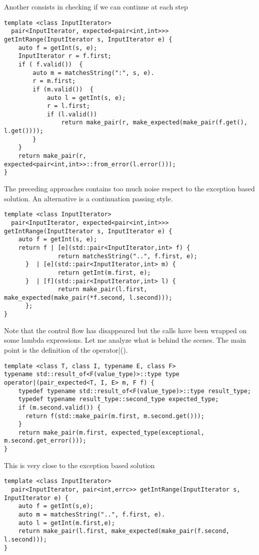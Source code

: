\documentclass[a4paper,10pt]{article}
\begin{document}
Another consists in checking if we can continue at each step

\begin{lstlisting}
template <class InputIterator>
  pair<InputIterator, expected<pair<int,int>>> getIntRange(InputIterator s, InputIterator e) {
    auto f = getInt(s, e);
    InputIterator r = f.first;
    if ( f.valid())  {
        auto m = matchesString(":", s, e).
        r = m.first;
        if (m.valid())  {
            auto l = getInt(s, e);
            r = l.first;
            if (l.valid())  
                return make_pair(r, make_expected(make_pair(f.get(), l.get())));
        }
    }        
    return make_pair(r, expected<pair<int,int>>::from_error(l.error()));
}
\end{lstlisting}

The preceding approaches contains too much noise respect to the exception based solution. An alternative is a continuation passing style. 

\begin{lstlisting}
template <class InputIterator>
  pair<InputIterator, expected<pair<int,int>>> getIntRange(InputIterator s, InputIterator e) {
    auto f = getInt(s, e);
    return f | [e](std::pair<InputIterator,int> f) {
    	       return matchesString("..", f.first, e); 
	  }  | [e](std::pair<InputIterator,int> m) {
               return getInt(m.first, e); 
	  }  | [f](std::pair<InputIterator,int> l) {
               return make_pair(l.first, make_expected(make_pair(*f.second, l.second))); 
	  };
}
\end{lstlisting}

Note that the control flow has disappeared but the calls have been wrapped on some lambda expressions. Let me analyze what is behind the scenes. The main point is the definition of the operator|(). 

\begin{lstlisting}
template <class T, class I, typename E, class F>
typename std::result_of<F(value_type)>::type type
operator|(pair_expected<T, I, E> m, F f) {
    typedef typename std::result_of<F(value_type)>::type result_type;
    typedef typename result_type::second_type expected_type;
    if (m.second.valid()) {
      return f(std::make_pair(m.first, m.second.get()));
    }
    return make_pair(m.first, expected_type(exceptional, m.second.get_error()));
}
\end{lstlisting}

This is very close to the exception based solution

\begin{lstlisting}
template <class InputIterator>
  pair<InputIterator, pair<int,errc>> getIntRange(InputIterator s, InputIterator e) {
    auto f = getInt(s,e);
    auto m = matchesString("..", f.first, e).
    auto l = getInt(m.first,e);       
    return make_pair(l.first, make_expected(make_pair(f.second, l.second)));
}
\end{lstlisting}
\end{document}
